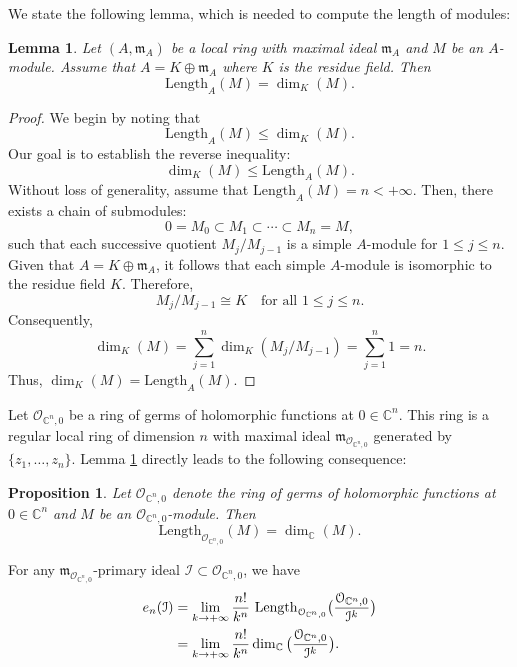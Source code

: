 \documentclass[a4paper,oneside,reqno,11pt]{article}
\newtheorem{lemma}[theorem]{Lemma}
\newtheorem{proposition}[theorem]{Proposition}
\begin{document}
We state the following lemma, which is needed to compute the length of modules:

\begin{lemma}\label{length_dimension}
Let $(A,\mathfrak{m}_A)$ be a local ring with maximal ideal $\mathfrak{m}_A$ and $M$ be an $A$-module. Assume that $A = K \oplus \mathfrak{m}_A$ where $K$ is the residue field. Then
$$\text{Length}_A (M) = \dim_K (M).$$
\end{lemma}

\begin{proof}
We begin by noting that
$$\text{Length}_A(M) \leq \dim_K(M).$$
Our goal is to establish the reverse inequality:
$$\dim_K(M) \leq \text{Length}_A(M).$$
Without loss of generality, assume that $\text{Length}_A(M) = n < + \infty$. Then, there exists a chain of submodules:
$$0 = M_0 \subset M_1 \subset \cdots \subset M_n = M,$$
such that each successive quotient $M_j / M_{j-1}$ is a simple $A$-module for $ 1 \leq j \leq n $. Given that $A = K \oplus \mathfrak{m}_A$, it follows that each simple $A$-module is isomorphic to the residue field $K$. Therefore,
$$M_j / M_{j-1} \cong K \quad \text{for all } 1 \leq j \leq n.$$
Consequently,
$$\dim_K(M) = \sum_{j=1}^n \dim_K(M_j / M_{j-1}) = \sum_{j=1}^n 1 = n.$$
Thus, $\dim_K(M) = \text{Length}_A(M) $.
\end{proof}

Let $\mathcal O_{ \mathbb C^n, 0}$ be a ring of germs of holomorphic functions at $0\in\mathbb C^n$. This ring is a regular local ring of dimension $n$ with maximal ideal  $\mathfrak{m}_{\mathcal{O}_{\mathbb{C}^n, 0}}$ generated by $\{z_1, \ldots, z_n\}$. Lemma \ref{length_dimension} directly leads to the following consequence:

\begin{proposition}\label{length_dimension1}
Let $\mathcal O_{ \mathbb C^n, 0}$ denote the ring of germs of holomorphic functions at $0\in\mathbb C^n$ and $M$ be an $\mathcal O_{ \mathbb C^n, 0}$-module. Then
$$\text{Length}_{\mathcal O_{ \mathbb C^n, 0}} (M) = \dim_{\mathbb C} (M).$$
\end{proposition}

For any $\mathfrak{m}_{ \mathcal O_{ \mathbb C^n, 0} }$-primary ideal $\mathcal I\subset\mathcal O_{ \mathbb C^n, 0}$, we have
$$\aligned e_n ( \mathcal I ) &= \lim\limits_{ k\to +\infty } \frac { n! } { k^n } \text { Length}_{ \mathcal O_{ \mathbb C^n, 0} } \big( \frac {\mathcal O_{ \mathbb C^n, 0} } { \mathcal I^{ k} } \big)\\
&= \lim\limits_{ k\to +\infty } \frac { n! } { k^n } \dim_{ \mathbb C } \big(\frac {\mathcal O_{ \mathbb C^n, 0} } { \mathcal I^{ k} } \big).
\endaligned$$
\end{document}
